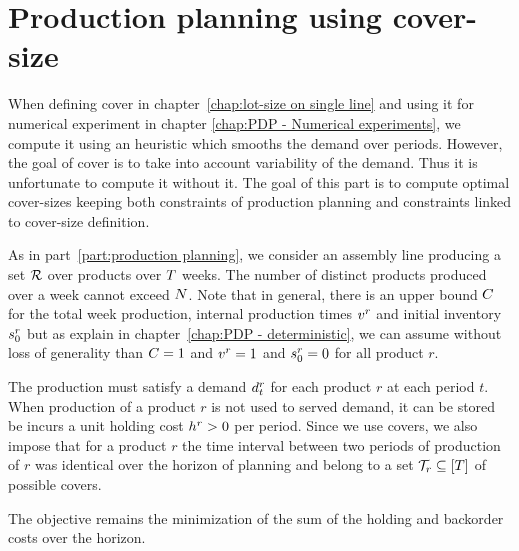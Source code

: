 \chapter{Production planning using cover-size}



\medskip

When defining cover in chapter~\ref{chap:lot-size on single line} and using it for numerical experiment in chapter \ref{chap:PDP - Numerical experiments}, we compute it using an heuristic which smooths the demand over periods. However, the goal of cover is to take into account variability of the demand. Thus it is unfortunate to compute it without it. The goal of this part is to compute optimal cover-sizes keeping both constraints of production planning and constraints linked to cover-size definition.

\medskip

As in part~\ref{part:production planning}, we consider an assembly line producing a set $\mathcal{R}$ over products over $T$ weeks. The number of distinct products produced over a week cannot exceed $N$. Note that in general, there is an upper bound $C$ for the total week production, internal production times $v^r$ and initial inventory $s_0^r$ but as explain in chapter~\ref{chap:PDP - deterministic}, we can assume without loss of generality than $C=1$ and $v^r=1$ and $s_0^r=0$ for all product $r$.

The production must satisfy a demand $d_t^r$ for each product $r$ at each period $t$.
When production of a product $r$ is not used to served demand, it can be stored be incurs a unit holding cost $h^r>0$ per period.
Since we use covers, we also impose that for a product $r$ the time interval between two periods of production of $r$ was identical over the horizon of planning and belong to a set $\coverset_r\subseteq\range{\horizon}$ of possible covers.

The objective remains the minimization of the sum of the holding and backorder costs over the horizon.

\medskip

